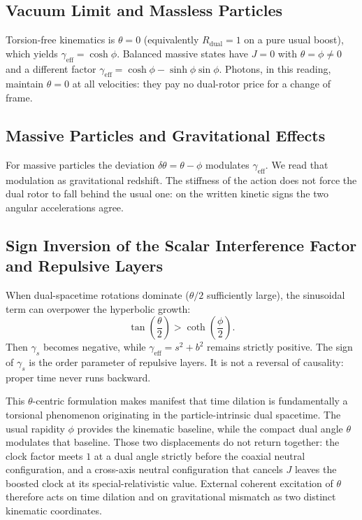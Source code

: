 \documentclass[a4paper]{article}
\begin{document}
\subsection{Vacuum Limit and Massless Particles}

Torsion-free kinematics is $\theta=0$ (equivalently $R_{\mathrm{dual}}=1$ on a pure usual boost), which yields $\gamma_{\mathrm{eff}}=\cosh\phi$. Balanced massive states have $J=0$ with $\theta=\phi\neq 0$ and a different factor $\gamma_{\mathrm{eff}}=\cosh\phi-\sinh\phi\sin\phi$. Photons, in this reading, maintain $\theta=0$ at all velocities: they pay no dual-rotor price for a change of frame.

\subsection{Massive Particles and Gravitational Effects}

For massive particles the deviation $\delta\theta=\theta-\phi$ modulates $\gamma_{\mathrm{eff}}$. We read that modulation as gravitational redshift. The stiffness of the action does not force the dual rotor to fall behind the usual one: on the written kinetic signs the two angular accelerations agree.

\subsection{Sign Inversion of the Scalar Interference Factor and Repulsive Layers}

When dual-spacetime rotations dominate ($\theta/2$ sufficiently large), the sinusoidal term can overpower the hyperbolic growth:
\[
\tan\left(\frac{\theta}{2}\right) > \coth\left(\frac{\phi}{2}\right).
\]
Then $\gamma_s$ becomes negative, while $\gamma_\text{eff}=s^2+b^2$ remains strictly positive. The sign of $\gamma_s$ is the order parameter of repulsive layers. It is not a reversal of causality: proper time never runs backward.

This $\theta$-centric formulation makes manifest that time dilation is fundamentally a torsional phenomenon originating in the particle-intrinsic dual spacetime. The usual rapidity $\phi$ provides the kinematic baseline, while the compact dual angle $\theta$ modulates that baseline. Those two displacements do not return together: the clock factor meets $1$ at a dual angle strictly before the coaxial neutral configuration, and a cross-axis neutral configuration that cancels $J$ leaves the boosted clock at its special-relativistic value. External coherent excitation of $\theta$ therefore acts on time dilation and on gravitational mismatch as two distinct kinematic coordinates.
\end{document}
